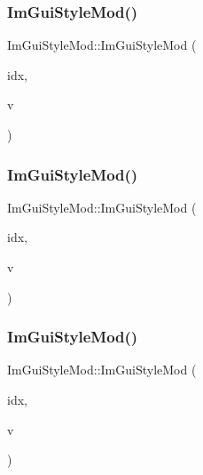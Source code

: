 \subsubsection{\texorpdfstring{Im\+Gui\+Style\+Mod()}{ImGuiStyleMod()}\hspace{0.1cm}{\footnotesize\ttfamily [1/3]}}
{\footnotesize\ttfamily Im\+Gui\+Style\+Mod\+::\+Im\+Gui\+Style\+Mod (\begin{DoxyParamCaption}\item[{Im\+Gui\+Style\+Var}]{idx,  }\item[{int}]{v }\end{DoxyParamCaption})}

\hypertarget{struct_im_gui_style_mod_a737c3fad802a8d5d4616f9decc7e402d}{}\label{struct_im_gui_style_mod_a737c3fad802a8d5d4616f9decc7e402d} 
\subsubsection{\texorpdfstring{Im\+Gui\+Style\+Mod()}{ImGuiStyleMod()}\hspace{0.1cm}{\footnotesize\ttfamily [2/3]}}
{\footnotesize\ttfamily Im\+Gui\+Style\+Mod\+::\+Im\+Gui\+Style\+Mod (\begin{DoxyParamCaption}\item[{Im\+Gui\+Style\+Var}]{idx,  }\item[{float}]{v }\end{DoxyParamCaption})}

\hypertarget{struct_im_gui_style_mod_a28647cc4ab8b95b8ee30e0fc7401ae07}{}\label{struct_im_gui_style_mod_a28647cc4ab8b95b8ee30e0fc7401ae07} 
\subsubsection{\texorpdfstring{Im\+Gui\+Style\+Mod()}{ImGuiStyleMod()}\hspace{0.1cm}{\footnotesize\ttfamily [3/3]}}
{\footnotesize\ttfamily Im\+Gui\+Style\+Mod\+::\+Im\+Gui\+Style\+Mod (\begin{DoxyParamCaption}\item[{Im\+Gui\+Style\+Var}]{idx,  }\item[{\hyperlink{struct_im_vec2}{Im\+Vec2}}]{v }\end{DoxyParamCaption})}



